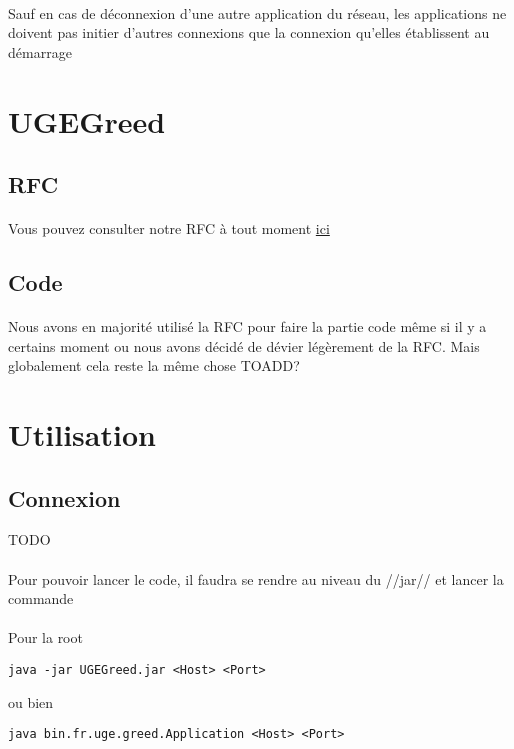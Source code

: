 \documentclass[a4paper,titlepage]{report}
\begin{document}
\paragraph{}
Sauf en cas de déconnexion d'une autre application du réseau, les applications ne doivent pas initier d'autres connexions que la connexion qu'elles établissent au démarrage
\pagebreak
\section{UGEGreed}
\subsection{RFC}
\paragraph{}
Vous pouvez consulter notre RFC à tout moment
\href {https://gitlab.com/Setsulys/ugegreed-debats-ly-ieng/-/blob/main/GreedRfc.md}{ici}
\subsection{Code}
\paragraph{}
Nous avons en majorité utilisé la RFC pour faire la partie code même si il y a certains moment ou nous avons décidé de dévier légèrement de la RFC. Mais globalement cela reste la même chose
\linebreak
TOADD?
\section{Utilisation}
\subsection{Connexion}
TODO
\paragraph{}
Pour pouvoir lancer le code, il faudra se rendre au niveau du //jar// et lancer la commande 
\paragraph{}
Pour la root
\begin{lstlisting}
java -jar UGEGreed.jar <Host> <Port>
\end{lstlisting}
ou bien
\begin{lstlisting}
java bin.fr.uge.greed.Application <Host> <Port>
\end{lstlisting}
\end{document}
